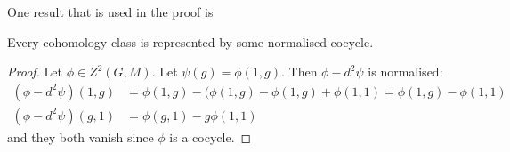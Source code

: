 \documentclass[a4paper]{article}
\begin{document}
One result that is used in the proof is

\begin{lemma}
  Every cohomology class is represented by some normalised cocycle.
\end{lemma}

\begin{proof}
  Let \(\phi \in Z^2(G, M)\). Let \(\psi(g) = \phi(1, g)\). Then \(\phi - d^2\psi\) is normalised:
  \begin{align*}
    (\phi - d^2\psi)(1, g)
    &= \phi(1, g) - (\phi(1, g) - \phi(1, g) + \phi(1, 1)
      = \phi(1, g) - \phi(1, 1) \\
    (\phi - d^2\psi)(g, 1)
    &= \phi(g, 1) - g \phi(1, 1)
  \end{align*}
  and they both vanish since \(\phi\) is a cocycle.
\end{proof}










\printindex
\end{document}
